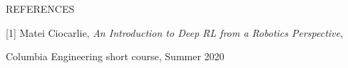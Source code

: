 \documentclass[12pt]{article}
\begin{document}
~\\~

\centerline{REFERENCES}

[1] Matei Ciocarlie, \textit{An Introduction to Deep RL from a Robotics Perspective},

Columbia Engineering short course, Summer 2020
\end{document}
